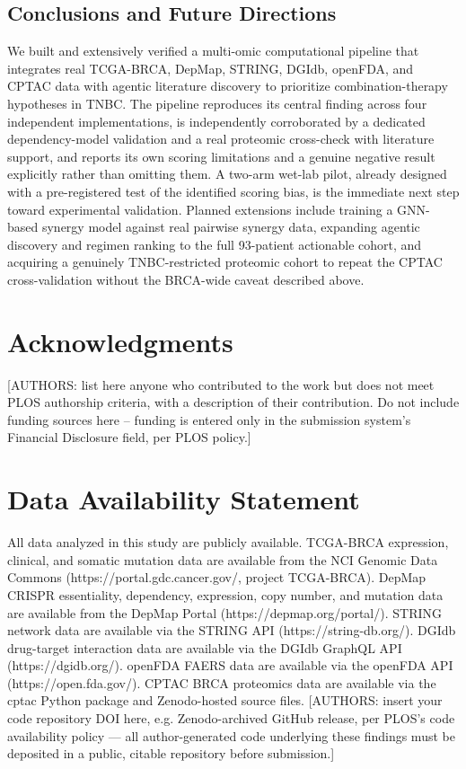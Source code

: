 \documentclass[10pt,letterpaper]{article}
\begin{document}
\subsection*{Conclusions and Future Directions}
We built and extensively verified a multi-omic computational pipeline that integrates real TCGA-BRCA, DepMap, STRING, DGIdb, openFDA, and CPTAC data with agentic literature discovery to prioritize combination-therapy hypotheses in TNBC. The pipeline reproduces its central finding across four independent implementations, is independently corroborated by a dedicated dependency-model validation and a real proteomic cross-check with literature support, and reports its own scoring limitations and a genuine negative result explicitly rather than omitting them. A two-arm wet-lab pilot, already designed with a pre-registered test of the identified scoring bias, is the immediate next step toward experimental validation. Planned extensions include training a GNN-based synergy model against real pairwise synergy data, expanding agentic discovery and regimen ranking to the full 93-patient actionable cohort, and acquiring a genuinely TNBC-restricted proteomic cohort to repeat the CPTAC cross-validation without the BRCA-wide caveat described above.

\section*{Acknowledgments}

[AUTHORS: list here anyone who contributed to the work but does not meet PLOS authorship
criteria, with a description of their contribution. Do not include funding sources here --
funding is entered only in the submission system's Financial Disclosure field, per PLOS
policy.]

\section*{Data Availability Statement}
All data analyzed in this study are publicly available. TCGA-BRCA expression, clinical, and somatic mutation data are available from the NCI Genomic Data Commons (https://portal.gdc.cancer.gov/, project TCGA-BRCA). DepMap CRISPR essentiality, dependency, expression, copy number, and mutation data are available from the DepMap Portal (https://depmap.org/portal/). STRING network data are available via the STRING API (https://string-db.org/). DGIdb drug-target interaction data are available via the DGIdb GraphQL API (https://dgidb.org/). openFDA FAERS data are available via the openFDA API (https://open.fda.gov/). CPTAC BRCA proteomics data are available via the cptac Python package and Zenodo-hosted source files. [AUTHORS: insert your code repository DOI here, e.g. Zenodo-archived GitHub release, per PLOS's code availability policy --- all author-generated code underlying these findings must be deposited in a public, citable repository before submission.]
\end{document}
